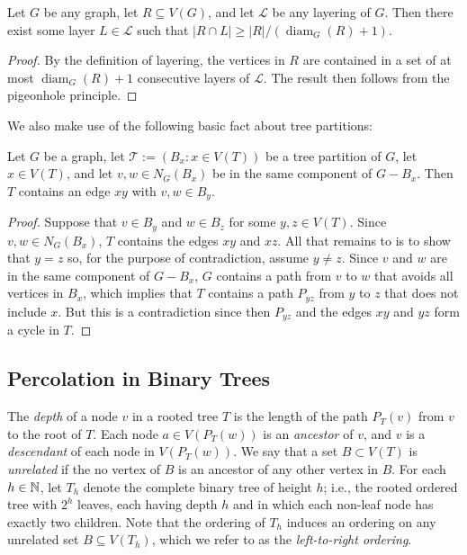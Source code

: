 \documentclass{patmorin}
\newcommand{\defin}[1]{\emph{\color{brightmaroon}#1}}
\DeclareMathOperator{\diam}{diam}
\renewcommand{\ge}{\geqslant}
\begin{document}
\begin{obs}\label{diameter_spread}
  Let $G$ be any graph, let $R\subseteq V(G)$, and let $\mathcal{L}$ be any layering of $G$.  Then there exist some layer $L\in\mathcal{L}$ such that $|R\cap L|\ge |R|/(\diam_G(R)+1)$.
\end{obs}

\begin{proof}
  By the definition of layering, the vertices in $R$ are contained in a set of at most $\diam_G(R)+1$ consecutive layers of $\mathcal{L}$. The result then follows from the pigeonhole principle.
\end{proof}


We also make use of the following basic fact about tree partitions:

\begin{obs}\label{tree_thingy}
  Let $G$ be a graph, let $\mathcal{T}:=(B_x:x\in V(T))$ be a tree partition of $G$, let $x\in V(T)$, and let $v,w\in N_G(B_x)$ be in the same component of $G-B_x$.  Then $T$ contains an edge $xy$ with $v,w\in B_y$.
\end{obs}

\begin{proof}
  Suppose that $v\in B_y$ and $w\in B_z$ for some $y,z\in V(T)$.  Since $v,w\in N_G(B_x)$, $T$ contains the edges $xy$ and $xz$.  All that remains to is to show that $y=z$ so, for the purpose of contradiction, assume $y\neq z$.  Since $v$ and $w$ are in the same component of $G-B_x$, $G$ contains a path from $v$ to $w$ that avoids all vertices in $B_x$, which implies that $T$ contains a path $P_{yz}$ from $y$ to $z$ that does not include $x$.  But this is a contradiction since then $P_{yz}$ and the edges $xy$ and $yz$ form a cycle in $T$.
\end{proof}

\subsection{Percolation in Binary Trees}


The \defin{depth} of a node $v$ in a rooted tree $T$ is the length of the path $P_T(v)$ from $v$ to the root of $T$.  Each node $a\in V(P_T(w))$ is an \defin{ancestor} of $v$, and $v$ is a \defin{descendant} of each node in $V(P_T(w))$.  We say that a set $B\subset V(T)$ is \defin{unrelated} if the no vertex of $B$ is an ancestor of any other vertex in $B$.  For each $h\in\mathbb{N}$, let $T_h$ denote the complete binary tree of height $h$; i.e., the rooted ordered tree with $2^h$ leaves, each having depth $h$ and in which each non-leaf node has exactly two children.  Note that the ordering of $T_h$ induces an ordering on any unrelated set $B\subseteq V(T_h)$, which we refer to as the \defin{left-to-right ordering}.
\end{document}
